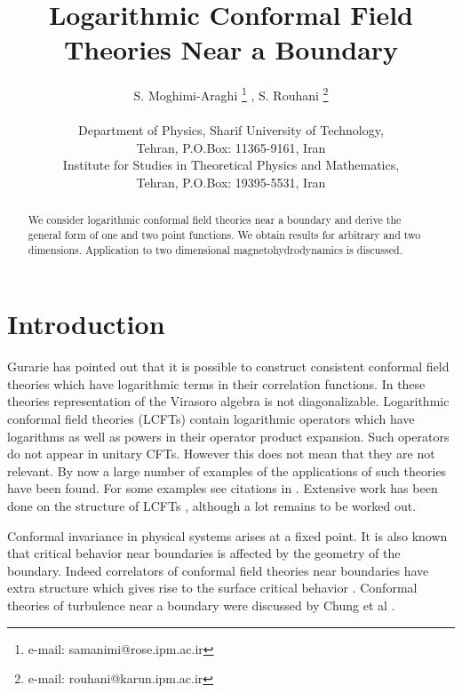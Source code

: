 \documentclass[a4paper,11pt]{article}
\begin{document}
\title{Logarithmic Conformal Field Theories Near a Boundary}
\author{S. Moghimi-Araghi\coordHE{} \footnote{e-mail: samanimi@rose.ipm.ac.ir} ,
S. Rouhani\coordHE{} \footnote{e-mail: rouhani@karun.ipm.ac.ir}\\
\\
\coordHE{}Department of Physics, Sharif University of Technology,\\
Tehran, P.O.Box: 11365-9161, Iran\\
\coordHE{}Institute for Studies in Theoretical Physics and Mathematics,\\
Tehran, P.O.Box: 19395-5531, Iran}
\maketitle

\begin{abstract}
We consider logarithmic conformal field theories near a boundary and derive the
general form of one and two point functions. We obtain results for arbitrary 
and two dimensions. Application to two dimensional magnetohydrodynamics is discussed.
\end{abstract}

\section{Introduction}

Gurarie has pointed out \cite{Gur} that it is possible to construct consistent 
conformal field theories which have logarithmic terms in their correlation functions.
In these theories representation of the Virasoro algebra is not diagonalizable.
Logarithmic conformal field theories (LCFTs) contain logarithmic operators 
which have logarithms as well as powers in their operator product expansion.
Such operators do not appear in unitary CFTs. However this does not mean that they are not
relevant. By now a large number of examples of the applications of such theories 
have been found. For some examples see citations in \cite{Flohr sing}.
Extensive work has been done on the structure of LCFTs \cite{Flohr sing,GK,RAK}, although a lot
remains to be worked out.

Conformal invariance in physical systems arises at a fixed point. It is also known that
critical behavior near boundaries is affected by the geometry of the boundary.
Indeed correlators of conformal field theories near boundaries have extra 
structure which gives rise to the surface critical behavior \cite{Cardy}. Conformal
theories of turbulence near a boundary were discussed by Chung et al
\cite{Koreans}.
\end{document}
